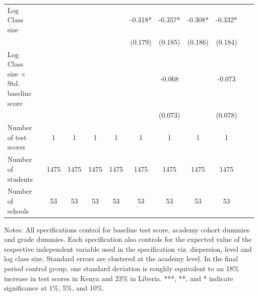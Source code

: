 \begin{center}
\begin{scriptsize}
\begin{threeparttable}
\begin{tabular} {@{} l l c c c c c c c c c c  @{}}
Log Class size &  &  &  &  &  & -0.318* & -0.357* & -0.308* & -0.332* \\
                 &  &  &  &  &  & (0.179) & (0.185) & (0.186) & (0.184) \\
Log Class size $\times$ Std. baseline score &  &  &  &  &  &  & -0.068 &  & -0.073 \\
                 &  &  &  &  &  &  & (0.073) &  & (0.078) \\
\midrule
Number of test scores &  & 1 & 1 & 1 & 1 & 1 & 1 & 1 & 1 \\
Number of students &  & 1475 & 1475 & 1475 & 1475 & 1475 & 1475 & 1475 & 1475 \\
Number of schools &  & 53 & 53 & 53 & 53 & 53 & 53 & 53 & 53 \\
\bottomrule
\end{tabular}
\begin{tablenotes}
\item Notes: All specifications control for baseline test score, academy cohort dummies and grade dummies. Each specification also controls for the expected value of the respective independent variable used in the specification viz. dispersion, level and log class size. Standard errors are clustered at the academy level. In the final period control group, one standard deviation is roughly equivalent to an 18\% increase in test scores in Kenya and 23\% in Liberia. ***, **, and * indicate significance at 1\%, 5\%, and 10\%.\end{tablenotes}
\end{threeparttable}
\end{scriptsize}
\end{center}
\clearpage
